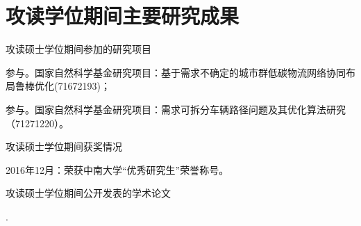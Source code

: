 \chapter*{攻读学位期间主要研究成果}

\begin{compactenum}[1.]
	\item 攻读硕士学位期间参加的研究项目
	\begin{compactenum}[(1).]
		\item 参与。国家自然科学基金研究项目：基于需求不确定的城市群低碳物流网络协同布局鲁棒优化(71672193)；
		\item 参与。国家自然科学基金研究项目：需求可拆分车辆路径问题及其优化算法研究（71271220）。
    \end{compactenum}	
	\item 攻读硕士学位期间获奖情况
	\begin{compactenum}[(1).]
		\item 2016年12月：荣获中南大学“优秀研究生”荣誉称号。
	\end{compactenum}
	\item 攻读硕士学位期间公开发表的学术论文
	\begin{compactenum}[{[}1{]}~]
		\item {}.
	\end{compactenum}
\end{compactenum}
